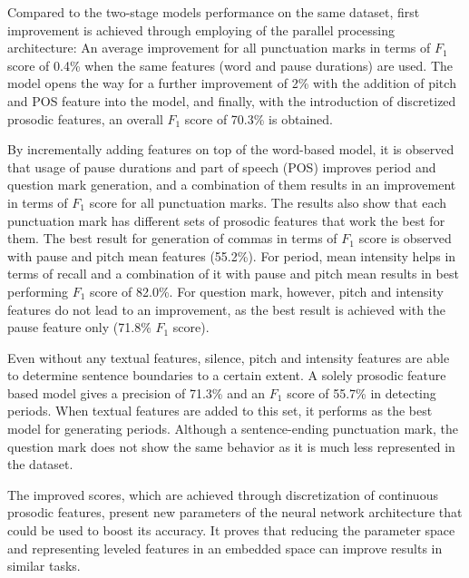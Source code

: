 Compared to the two-stage models performance on the same dataset, first improvement is achieved through employing of the parallel processing architecture: An average improvement for all punctuation marks in terms of $F_1$ score of 0.4\% when the same features (word and pause durations) are used. The model opens the way for a further improvement of 2\% with the addition of pitch and POS feature into the model, and finally, with the introduction of discretized prosodic features, an overall $F_1$ score of 70.3\% is obtained.

By incrementally adding features on top of the word-based model, it is observed that usage of pause durations and part of speech (POS) improves period and question mark generation, and a combination of them results in an improvement in terms of $F_1$ score for all punctuation marks. The results also show that each punctuation mark has different sets of prosodic features that work the best for them. The best result for generation of commas in terms of $F_1$ score is observed with pause and pitch mean features (55.2\%). For period, mean intensity helps in terms of recall and a combination of it with pause and pitch mean results in best performing $F_1$ score of 82.0\%. For question mark, however, pitch and intensity features do not lead to an improvement, as the best result is achieved with the pause feature only (71.8\% $F_1$ score). 

Even without any textual features, silence, pitch and intensity features are able to determine sentence boundaries to a certain extent. A solely prosodic feature based model gives a precision of 71.3\% and an $F_1$ score of 55.7\% in detecting periods. When textual features are added to this set, it performs as the best model for generating periods. Although a sentence-ending punctuation mark, the question mark does not show the same behavior as it is much less represented in the dataset. 

The improved scores, which are achieved through discretization of continuous prosodic features, present new parameters of the neural network architecture that could be used to boost its accuracy. It proves that reducing the parameter space and representing leveled features in an embedded space can improve results in similar tasks. 

